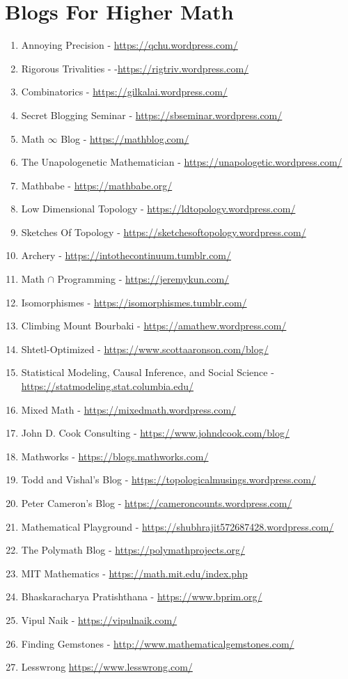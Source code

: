 \documentclass{article}
\begin{document}
\section*{Blogs For Higher Math}
\begin{enumerate}

\item Annoying Precision - \url{https://qchu.wordpress.com/}
\item Rigorous Trivalities - -\url{https://rigtriv.wordpress.com/}
\item Combinatorics - \url{https://gilkalai.wordpress.com/}
\item Secret Blogging Seminar - \url{https://sbseminar.wordpress.com/}
\item Math $\infty$ Blog - \url{https://mathblog.com/}
\item The Unapologenetic Mathematician - \url{https://unapologetic.wordpress.com/}
\item Mathbabe - \url{https://mathbabe.org/}
\item Low Dimensional Topology - \url{https://ldtopology.wordpress.com/}
\item Sketches Of Topology - \url{https://sketchesoftopology.wordpress.com/}
\item Archery - \url{https://intothecontinuum.tumblr.com/}
\item Math $\cap$ Programming - \url{https://jeremykun.com/}
\item Isomorphismes - \url{https://isomorphismes.tumblr.com/}
\item Climbing Mount Bourbaki - \url{https://amathew.wordpress.com/}
\item Shtetl-Optimized - \url{https://www.scottaaronson.com/blog/}
\item Statistical Modeling, Causal Inference, and Social Science - \url{https://statmodeling.stat.columbia.edu/}
\item Mixed Math - \url{https://mixedmath.wordpress.com/}
\item John D. Cook Consulting - \url{https://www.johndcook.com/blog/}
\item Mathworks - \url{https://blogs.mathworks.com/}
\item Todd and Vishal's Blog - \url{https://topologicalmusings.wordpress.com/}
\item Peter Cameron's Blog - \url{https://cameroncounts.wordpress.com/}
\item Mathematical Playground - \url{https://shubhrajit572687428.wordpress.com/}
\item The Polymath Blog - \url{https://polymathprojects.org/}
\item MIT Mathematics - \url{https://math.mit.edu/index.php}
\item Bhaskaracharya Pratishthana - \url{https://www.bprim.org/}
\item Vipul Naik - \url{https://vipulnaik.com/}
\item Finding Gemstones - \url{http://www.mathematicalgemstones.com/}
\item Lesswrong \url{https://www.lesswrong.com/}
\end{enumerate}
\end{document}

